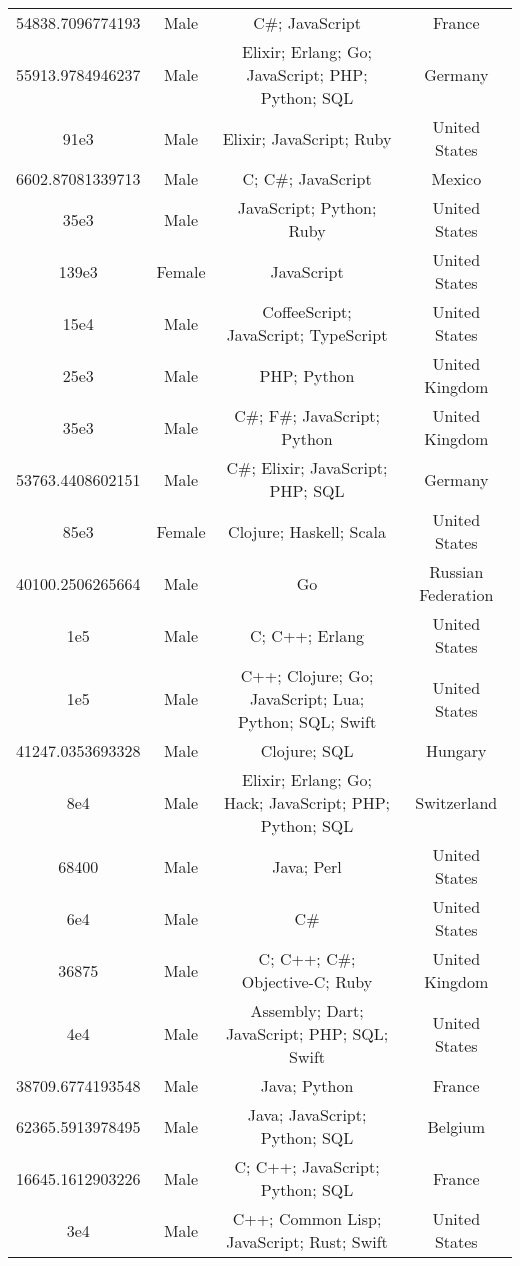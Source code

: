 \begin{center}
\begin{tabular}{ |c|c|c|c| }
54838.7096774193  &  Male  &  C\#; JavaScript  &  France  \\ 
55913.9784946237  &  Male  &  Elixir; Erlang; Go; JavaScript; PHP; Python; SQL  &  Germany  \\ 
91e3  &  Male  &  Elixir; JavaScript; Ruby  &  United States  \\ 
6602.87081339713  &  Male  &  C; C\#; JavaScript  &  Mexico  \\ 
35e3  &  Male  &  JavaScript; Python; Ruby  &  United States  \\ 
139e3  &  Female  &  JavaScript  &  United States  \\ 
15e4  &  Male  &  CoffeeScript; JavaScript; TypeScript  &  United States  \\ 
25e3  &  Male  &  PHP; Python  &  United Kingdom  \\ 
35e3  &  Male  &  C\#; F\#; JavaScript; Python  &  United Kingdom  \\ 
53763.4408602151  &  Male  &  C\#; Elixir; JavaScript; PHP; SQL  &  Germany  \\ 
85e3  &  Female  &  Clojure; Haskell; Scala  &  United States  \\ 
40100.2506265664  &  Male  &  Go  &  Russian Federation  \\ 
1e5  &  Male  &  C; C++; Erlang  &  United States  \\ 
1e5  &  Male  &  C++; Clojure; Go; JavaScript; Lua; Python; SQL; Swift  &  United States  \\ 
41247.0353693328  &  Male  &  Clojure; SQL  &  Hungary  \\ 
8e4  &  Male  &  Elixir; Erlang; Go; Hack; JavaScript; PHP; Python; SQL  &  Switzerland  \\ 
68400  &  Male  &  Java; Perl  &  United States  \\ 
6e4  &  Male  &  C\#  &  United States  \\ 
36875  &  Male  &  C; C++; C\#; Objective-C; Ruby  &  United Kingdom  \\ 
4e4  &  Male  &  Assembly; Dart; JavaScript; PHP; SQL; Swift  &  United States  \\ 
38709.6774193548  &  Male  &  Java; Python  &  France  \\ 
62365.5913978495  &  Male  &  Java; JavaScript; Python; SQL  &  Belgium  \\ 
16645.1612903226  &  Male  &  C; C++; JavaScript; Python; SQL  &  France  \\ 
3e4  &  Male  &  C++; Common Lisp; JavaScript; Rust; Swift  &  United States  \\ 

\end{tabular}
\end{center}
